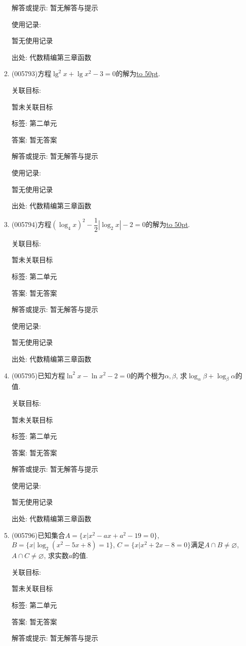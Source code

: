 \documentclass[10pt,a4paper]{article}
\newcommand{\blank}[1]{\underline{\hbox to #1pt{}}}
\begin{document}
\begin{enumerate}[1.]
解答或提示: 暂无解答与提示

使用记录:

暂无使用记录


出处: 代数精编第三章函数
\item { (005793)}方程$\lg ^2x+\lg x^2-3=0$的解为\blank{50}.


关联目标:

暂未关联目标



标签: 第二单元

答案: 暂无答案

解答或提示: 暂无解答与提示

使用记录:

暂无使用记录


出处: 代数精编第三章函数
\item { (005794)}方程$(\log_4x)^2-\dfrac 12|\log_2x|-2=0$的解为\blank{50}.


关联目标:

暂未关联目标



标签: 第二单元

答案: 暂无答案

解答或提示: 暂无解答与提示

使用记录:

暂无使用记录


出处: 代数精编第三章函数
\item { (005795)}已知方程$\ln ^2x-\ln x^2-2=0$的两个根为$\alpha ,\beta$, 求$\log_{\alpha }\beta +\log_{\beta }\alpha$的值.


关联目标:

暂未关联目标



标签: 第二单元

答案: 暂无答案

解答或提示: 暂无解答与提示

使用记录:

暂无使用记录


出处: 代数精编第三章函数
\item { (005796)}已知集合$A=\{x|x^2-ax+a^2-19=0\}$, $B=\{x|\log_2(x^2-5x+8)=1\}$, $C=\{x|x^2+2x-8=0\}$满足$A\cap B\ne \varnothing$, $A\cap C\ne \varnothing$, 求实数$a$的值.


关联目标:

暂未关联目标



标签: 第二单元

答案: 暂无答案

解答或提示: 暂无解答与提示


\end{enumerate}
\end{document}
